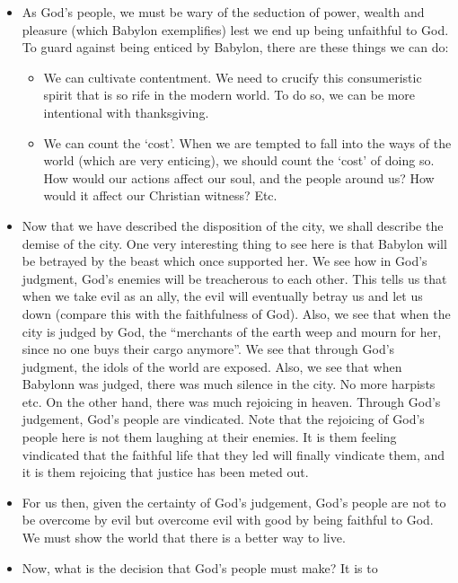 \begin{itemize}
{  is bent on opposing God and instigating ungodliness and enticing God's
  people to idolatry.  }
  \item{As God's people, we must be wary of the seduction of power, wealth
  and pleasure (which Babylon exemplifies) lest we end up being unfaithful to
  God.  To guard against being enticed by Babylon, there are these things we
  can do:
  \begin{itemize}
    \item{We can cultivate contentment.  We need to crucify this
    consumeristic spirit that is so rife in the modern world.  To do so, we
    can be more intentional with thanksgiving.}
    \item{We can count the `cost'.  When we are tempted to fall into the ways
    of the world (which are very enticing), we should count the `cost' of
    doing so.  How would our actions affect our soul, and the people around
    us?  How would it affect our Christian witness?  Etc.  }
  \end{itemize}}
  \item{Now that we have described the disposition of the city, we shall
  describe the demise of the city.  One very interesting thing to see here is
  that Babylon will be betrayed by the beast which once supported her.  We
  see how in God's judgment, God's enemies will be treacherous to each other.
  This tells us that when we take evil as an ally, the evil will eventually
  betray us and let us down (compare this with the faithfulness of God).
  Also, we see that when the city is judged by God, the ``merchants of the
  earth weep and mourn for her, since no one buys their cargo anymore''.  We
  see that through God's judgment, the idols of the world are exposed.  Also,
  we see that when Babylonn was judged, there was much silence in the city.
  No more harpists etc.  On the other hand, there was much rejoicing in
  heaven.  Through God's judgement, God's people are vindicated.  Note that
  the rejoicing of God's people here is not them laughing at their enemies.
  It is them feeling vindicated that the faithful life that they led will
  finally vindicate them, and it is them rejoicing that justice has been
  meted out. }
  \item{For us then, given the certainty of God's judgement, God's people are
  not to be overcome by evil but overcome evil with good by being faithful to
  God.  We must show the world that there is a better way to live.}
  \item{Now, what is the decision that God's people must make?  It is to
}
\end{itemize}
